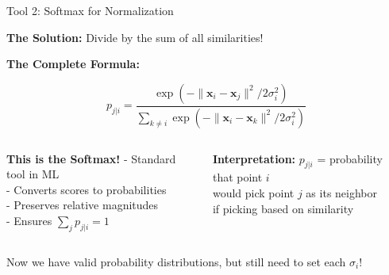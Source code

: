 \documentclass{beamer}
\begin{document}
\begin{frame}{Tool 2: Softmax for Normalization}
\vspace{-0.2cm}

\textbf{\color{upcblue}The Solution:} Divide by the sum of all similarities!

\vspace{0.3cm}
\begin{center}
\end{center}

\vspace{0.3cm}
\textbf{The Complete Formula:}
\begin{center}
\colorbox{upcblue!10}{
\begin{minipage}{0.9\textwidth}
\centering
$$p_{j|i} = \frac{\exp(-\|\mathbf{x}_i - \mathbf{x}_j\|^2 / 2\sigma_i^2)}{\sum_{k \neq i} \exp(-\|\mathbf{x}_i - \mathbf{x}_k\|^2 / 2\sigma_i^2)}$$
\end{minipage}
}
\end{center}

\vspace{0.3cm}
\begin{columns}[T]
\begin{column}{0.48\textwidth}
\textbf{This is the Softmax!}
\footnotesize
- Standard tool in ML\\
- Converts scores to probabilities\\
- Preserves relative magnitudes\\
- Ensures $\sum_j p_{j|i} = 1$
\end{column}

\begin{column}{0.48\textwidth}
\textbf{Interpretation:}
\footnotesize
$p_{j|i}$ = probability that point $i$\\
would pick point $j$ as its neighbor\\
if picking based on similarity
\end{column}
\end{columns}

\vspace{0.2cm}
\begin{center}
\colorbox{highlight!20}{
\begin{minipage}{0.85\textwidth}
\centering
\footnotesize Now we have valid probability distributions, but still need to set each $\sigma_i$!
\end{minipage}
}
\end{center}
\end{frame}
\end{document}
